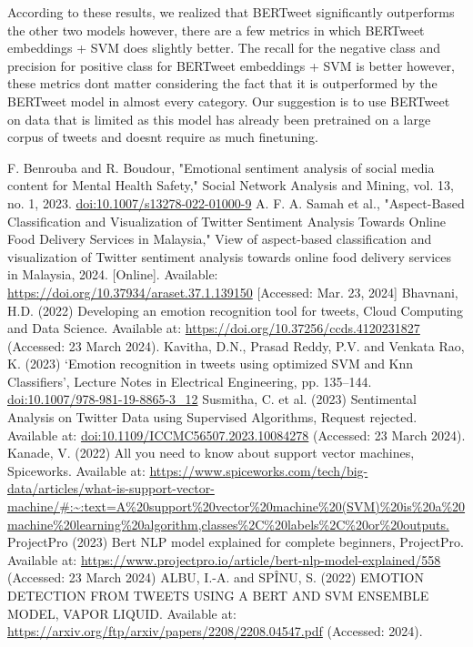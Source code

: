 \documentclass[conference]{IEEEtran}
\begin{document}
According to these results, we realized that BERTweet significantly outperforms the other two models however, there are a few metrics in which BERTweet embeddings + SVM does slightly better. The recall for the negative class and precision for positive class for BERTweet embeddings + SVM is better however, these metrics dont matter considering the fact that it is outperformed by the BERTweet model in almost every category. Our suggestion is to use BERTweet on data that is limited as this model has already been pretrained on a large corpus of tweets and doesnt require as much finetuning. 


\begin{thebibliography}{00}
 F. Benrouba and R. Boudour, "Emotional sentiment analysis of social media content for Mental Health Safety," Social Network Analysis and Mining, vol. 13, no. 1, 2023. \url{doi:10.1007/s13278-022-01000-9}
 A. F. A. Samah et al., "Aspect-Based Classification and Visualization of Twitter Sentiment Analysis Towards Online Food Delivery Services in Malaysia," View of aspect-based classification and visualization of Twitter sentiment analysis towards online food delivery services in Malaysia, 2024. [Online]. Available: \url{https://doi.org/10.37934/araset.37.1.139150} [Accessed: Mar. 23, 2024]
 Bhavnani, H.D. (2022) Developing an emotion recognition tool for tweets, Cloud Computing and Data Science. Available at: \url{https://doi.org/10.37256/ccds.4120231827} (Accessed: 23 March 2024). 
 Kavitha, D.N., Prasad Reddy, P.V. and Venkata Rao, K. (2023) ‘Emotion recognition in tweets using optimized SVM and Knn Classifiers’, Lecture Notes in Electrical Engineering, pp. 135–144. \url{doi:10.1007/978-981-19-8865-3_12}
Susmitha, C. et al. (2023) Sentimental Analysis on Twitter Data using Supervised Algorithms, Request rejected. Available at: \url{doi:10.1109/ICCMC56507.2023.10084278} (Accessed: 23 March 2024).
 Kanade, V. (2022) All you need to know about support vector machines, Spiceworks. Available at: \url{https://www.spiceworks.com/tech/big-data/articles/what-is-support-vector-machine/#:~:text=A%20support%20vector%20machine%20(SVM)%20is%20a%20machine%20learning%20algorithm,classes%2C%20labels%2C%20or%20outputs.}
 ProjectPro (2023) Bert NLP model explained for complete beginners, ProjectPro. Available at: \url{https://www.projectpro.io/article/bert-nlp-model-explained/558} (Accessed: 23 March 2024)
 ALBU, I.-A. and SPÎNU, S. (2022) EMOTION DETECTION FROM TWEETS USING A BERT AND SVM ENSEMBLE MODEL, VAPOR LIQUID. Available at: \url{https://arxiv.org/ftp/arxiv/papers/2208/2208.04547.pdf} (Accessed: 2024). 

\end{thebibliography}
\end{document}
